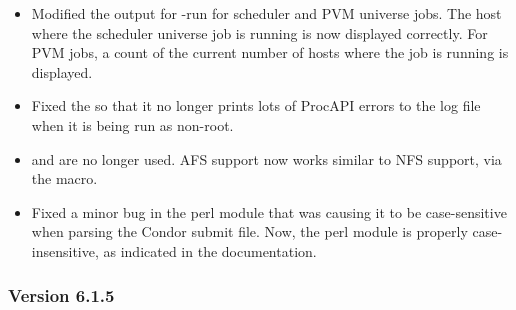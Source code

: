 \begin{itemize}
\item Modified the output for  -run for scheduler and PVM
universe jobs.  The host where the scheduler universe job is running
is now displayed correctly.  For PVM jobs, a count of the current
number of hosts where the job is running is displayed.

\item Fixed the  so that it no longer prints lots of
ProcAPI errors to the log file when it is being run as non-root.

\item {} and  are no longer
used.  AFS support now works similar to NFS support, via the
 macro.

\item Fixed a minor bug in the  perl module that was
causing it to be case-sensitive when parsing the Condor submit file.
Now, the perl module is properly case-insensitive, as indicated in the
documentation.

\end{itemize}

\subsubsection{\label{sec:New-6-1-5}Version 6.1.5}

